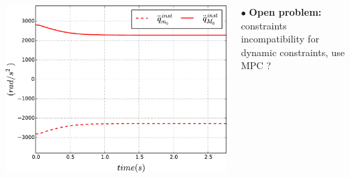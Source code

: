 \begin{frame}
\begin{columns}
\begin{columns}
\column{.45\paperwidth}
\hspace{-5mm}
\vspace{5mm}
\includegraphics[width=0.80\columnwidth]{figures/instant_articular_acceleration_capability.pdf}
\end{columns}

\vspace{-3mm}

$\bullet$ {\color{blue}\textbf{Open problem:} constraints incompatibility for dynamic constraints, use MPC ?}
\end{columns}



\end{frame}










%









